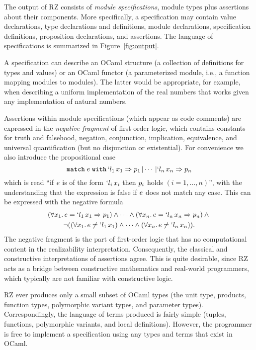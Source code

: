 The output of RZ consists of \emph{module specifications}, module types
plus assertions about their components.  More specifically, a specification
may contain value declarations, type declarations and definitions, module
declarations, specification definitions, proposition declarations, and
assertions.  The language of specifications is summarized in
Figure~\ref{fig:output}.

A specification can describe an OCaml structure (a collection of 
definitions for types and values) or an OCaml functor (a parameterized
module, i.e., a function mapping modules to modules).  The latter would
be appropriate, for example, when describing a uniform implementation of the real numbers
that works given any implementation of natural numbers.

Assertions within module specifications (which appear as code comments)
are expressed in the \emph{negative fragment} of
first-order logic, which contains constants for truth and falsehood,
negation, conjunction, implication, equivalence, and universal
quantification (but no disjunction or existential). 
%
\iflong
For convenience we
also introduce the propositional case
%
\begin{equation*}
  \mathtt{match}\;e\;\mathtt{with}\,`l_1\,x_1\Rightarrow{p_1}\,|\cdots\,|`l_n\,x_n\Rightarrow{p_n}
\end{equation*}
%
which is read ``if $e$ is of the form $`l_i\,x_i$ then
$p_i$ holds $(i = 1, \ldots, n)$'', with the understanding that the
expression is false if $e$ does not match any case. This can be
expressed with the negative formula
%
\begin{multline*}
  (\forall x_1.\, e = `l_1\,x_1 \Rightarrow p_1)
  \land \cdots \land
  (\forall x_n.\,e = `l_n\,x_n \Rightarrow p_n)
  \land {} \\
  \lnot ((\forall x_1.\, e \neq `l_1\,x_1) \land \cdots \land
  (\forall x_n.\, e \neq `l_n\,x_n)).
\end{multline*}
%
\fi %
%
The negative fragment is the part of first-order logic that has no
computational content in the realizability interpretation.
Consequently, the classical and constructive interpretations of
assertions agree. This is quite desirable, since RZ acts as a bridge
between constructive mathematics and real-world programmers, which
typically are not familiar with constructive logic.


RZ ever produces only a small subset of OCaml types (the unit type,
products, function types, polymorphic variant types, and parameter
types). Correspondingly, the language of terms produced is fairly simple
(tuples, functions, polymorphic variants, and local definitions).
However, the programmer is free to implement a specification using any
types and terms that exist in OCaml. 

